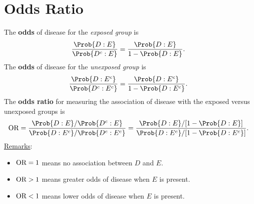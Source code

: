 \section{Odds Ratio}
\begin{Regular}{}
    The \textbf{odds} of disease for the \emph{exposed group} is
    \[ \frac{\Prob{D\given E}}{\Prob{D^c\given E}}=\frac{\Prob{D\given E}}{1-\Prob{D\given E}}. \]
    The \textbf{odds} of disease for the \emph{unexposed group} is
    \[ \frac{\Prob{D\given E^c}}{\Prob{D^c\given E^c}}=\frac{\Prob{D\given E^c}}{1-\Prob{D\given E^c}}. \]
    The \textbf{odds ratio} for measuring the association of disease
    with the exposed versus unexposed groups is
    \[ \OR=\frac{\Prob{D\given E}/\Prob{D^c\given E}}{\Prob{D\given E^c}/\Prob{D^c\given E^c}}
        =\frac{\Prob{D\given E}/[1-\Prob{D\given E}]}{\Prob{D\given E^c}/[1-\Prob{D\given E^c}]}. \]
    \tcblower{}
    \underline{Remarks}:
    \begin{itemize}
        \item $ \text{OR}=1 $ means no association between $ D $ and $ E $.
        \item $ \text{OR}>1 $ means greater odds of disease when $ E $ is present.
        \item $ \text{OR}<1 $ means lower odds of disease when $ E $ is present.
    \end{itemize}
\end{Regular}
